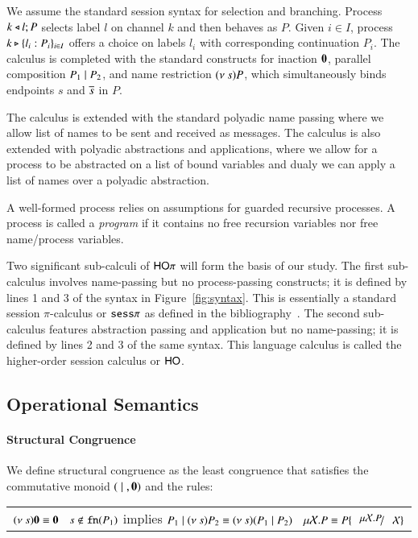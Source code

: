 We assume the standard session syntax for selection and branching. Process
$k \triangleleft l ; P$ selects label $l$ on channel $k$ and then behaves as $P$. 
Given $i \in I$, 
process 
$k \triangleright \{l_i:P_i\}_{i \in I}$ offers a choice on labels $l_i$ with
corresponding continuation $P_i$.
The calculus is completed with the standard constructs for 
inaction $\mathbf{0}$, 
parallel composition $P_1 \;|\; P_2$, and 
name restriction $(\nu\ s) P$, which simultaneously binds endpoints $s$ and $\overline{s}$ in $P$.

The calculus is extended with the standard polyadic name passing where
we allow list of names to be sent and received as messages. 
The calculus is also extended with polyadic abstractions and applications,
where we allow for a process to be abstracted on a list of
bound variables and dualy we can apply a list of names
over a polyadic abstraction.

A well-formed process relies on assumptions for guarded recursive processes.
A process is called a \emph{program} if it contains 
no free recursion variables nor free name/process variables.



Two significant sub-calculi of $\mathsf{HO}\pi$ will form the basis of our study.
The first sub-calculus involves name-passing but no process-passing constructs; it is 
defined by lines 1 and 3 of the syntax in Figure~\ref{fig:syntax}.
This is essentially a standard session $\pi$-calculus 
or $\mathtt{sess}\pi$ as defined in the bibliography~\cite{}.
The second sub-calculus features abstraction passing and application but no name-passing; 
it is defined by lines 2 and 3 of the same syntax. This language 
calculus is called the higher-order session calculus or $\mathsf{HO}$.


\subsection{Operational Semantics}

\paragraph{Structural Congruence}

We define structural congruence as the least congruence that satisfies the commutative monoid $(\;|\;, \mathbf{0})$
and the rules:

\begin{tabular}{c}
	$(\nu\ s) \mathbf{0} \equiv \mathbf{0} \quad
	s \notin \mathtt{fn}(P_1)$ implies $P_1 \Par \news{s} P_2 \scong \news{s}(P_1 \Par P_2)
	\quad \rec{X}{P} \scong P\subst{\rec{X}{P}}{\rvar{X}}$
\end{tabular}


